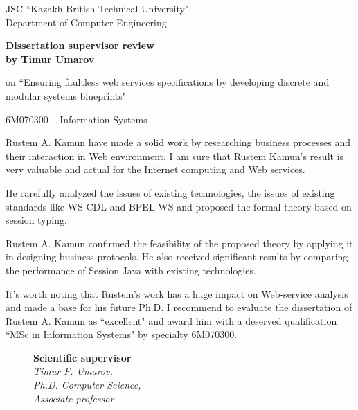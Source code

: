 \begin{titlepage}
\begin{centering}
{        \vspace{14pt}

        JSC ``Kazakh-British Technical University"\\
        Department of Computer Engineering}
       \vspace{14pt}

        {\bf
        Dissertation supervisor review\\
        by Timur Umarov
        }
        
        on ``Ensuring faultless web services specifications by developing discrete and modular systems blueprints"

        \vspace{14pt}
        \small 6M070300 -- Information Systems

    \end{centering}
    
    
    
 Rustem A. Kamun have made a solid work by researching business processes and their interaction in Web environment. I am sure that Rustem Kamun’s result is very valuable and actual for the Internet computing and Web services.
    
He carefully analyzed the issues of existing technologies, the issues of existing standards like WS-CDL and BPEL-WS and proposed the formal theory based on session typing.
    
Rustem A. Kamun confirmed the feasibility of the proposed theory by applying it in designing business protocols. He also received significant results by comparing the performance of Session Java with existing technologies.
     
It’s worth noting that Rustem's work has a huge impact on Web-service analysis and made a base for his future Ph.D.
I recommend to evaluate the dissertation of Rustem A. Kamun as ``excellent" and award him with a deserved qualification ``MSc in Information Systems" by specialty 6M070300.
    

         \begin{figure}[ht]
            \begin{minipage}[t]{0.6\linewidth}
                {\bf Scientific supervisor}\\

                {\em Timur F. Umarov,\\
                Ph.D. Computer Science,\\
                Associate professor}\\
                

\end{minipage}
\end{figure}
\end{titlepage}
